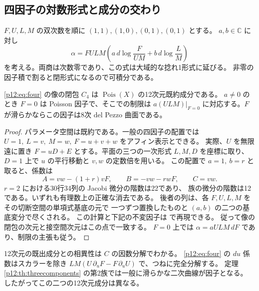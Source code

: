 \subsection{四因子の対数形式と成分の交わり}
\label{p12:sec:four}
$F,U,L,M$ の双次数を順に $(1,1),(1,0),(0,1),(0,1)$ とする。
$a,b\in\mathbb C$ に対し
\begin{equation}\label{p12:eq:four}
 \alpha=FULM\left(a\,d\log\frac{F}{UM}
                    +b\,d\log\frac L M\right)
\end{equation}
を考える。両商は次数零であり、この式は大域的な捻れ1形式に延びる。
非零の因子積で割ると閉形式になるので可積分である。
\begin{theorem}\label{p12:th:four}
\eqref{p12:eq:four} の像の閉包 $C_4$ は $\operatorname{Pois}(X)$ の12次元既約成分である。
$a\ne0$ のとき $F=0$ は Poisson 因子で、そこでの制限は
$a(ULM)|_{F=0}$ に対応する。$F$ が滑らかならこの因子は8次 del Pezzo 曲面である。
\end{theorem}
\begin{proof}
パラメータ空間は既約である。一般の四因子の配置では
$U=1,\ L=v,\ M=w,\ F=u+v+w$ をアフィン表示とできる。
実際、$U$ を無限遠に置き $F=uD+E$ とする。平面の三つの一次形式 $L,M,D$
を座標に取り、$D=1$ 上で $u$ の平行移動と $v,w$ の定数倍を用いる。
この配置で $a=1,\ b=r$ と取ると、係数は
\[
 A=vw-(1+r)vF,\qquad B=-vw-rwF,\qquad C=vw.
\]
$r=2$ における30行34列の Jacobi 微分の階数は22であり、
族の微分の階数は12である。いずれも有理数上の正確な消去である。
後者の列は、各 $F,U,L,M$ をその切断空間の単項式基底の元で
一つずつ置換したものと $(a,b)$ の二つの基底変分で尽くされる。
この計算と下記の不変因子は  で再現できる。
従って像の閉包の次元と接空間次元はこの点で一致する。
$F=0$ 上では $\alpha=aULM\,dF$ であり、制限の主張も従う。
\end{proof}

12次元の既出成分との相異性は $C$ の因数分解でわかる。
\eqref{p12:eq:four} の $du$ 係数はスカラーを除き
$LM(U\,\partial_u F-F\,\partial_u U)$ で、つねに完全分解する。
定理\ref{p12:th:threecomponents} の第2族では一般に滑らかな二次曲線が因子となる。
したがってこの二つの12次元成分は異なる。

